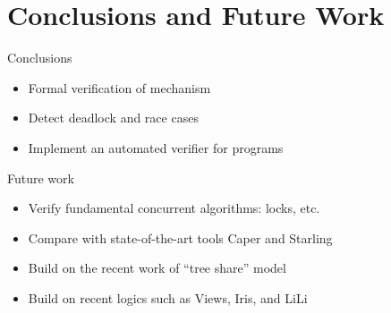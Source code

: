 \documentclass[11pt]{beamer}
\begin{document}
\section{Conclusions and Future Work}
\begin{frame}{Conclusions}
  \begin{itemize}
  \item Formal verification of {\CDL} mechanism
  \item Detect deadlock and race cases
  \item Implement an automated verifier for {\CDL} programs
  \end{itemize}
\end{frame}

\begin{frame}{Future work}
  \begin{itemize}
  \item Verify fundamental concurrent algorithms: locks, etc.
  \item Compare with state-of-the-art tools Caper and Starling
    \item Build on the recent work of ``tree share'' model
  \item Build on recent logics such as Views, Iris, and LiLi
  \end{itemize}
\end{frame}
\end{document}
